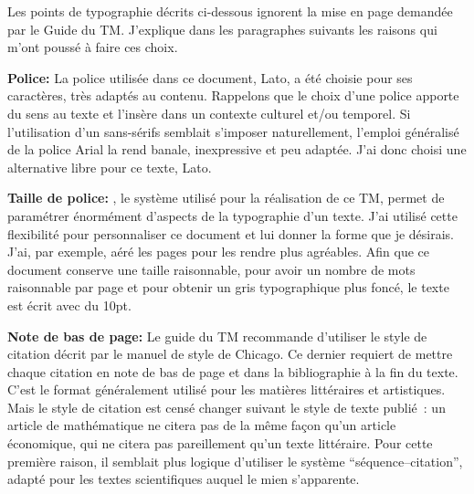 \hspace*{4.5cm}
\begin{minipage}{\textwidth-4.5cm}
	\setlength{\parskip}{\currentparskip}
	Les points de typographie décrits ci-dessous ignorent la mise en page demandée par le Guide du TM. J'explique dans les paragraphes suivants les raisons qui m'ont poussé à faire ces choix.
	
	\textbf{Police:} La police utilisée dans ce document, Lato, a été choisie pour ses caractères, très adaptés au contenu. Rappelons que le choix d'une police apporte du sens au texte et l'insère dans un contexte culturel et/ou temporel. Si l'utilisation d'un sans-sérifs semblait s'imposer naturellement, l'emploi généralisé de la police Arial la rend banale, inexpressive et peu adaptée. J'ai donc choisi une alternative libre pour ce texte, Lato.
	
	\textbf{Taille de police:} \XeLaTeX, le système utilisé pour la réalisation de ce TM, permet de paramétrer énormément d'aspects de la typographie d'un texte. J'ai utilisé cette flexibilité pour personnaliser ce document et lui donner la forme que je désirais. J'ai, par exemple, aéré les pages pour les rendre plus agréables. Afin que ce document conserve une taille raisonnable, pour avoir un nombre de mots raisonnable par page et pour obtenir un gris typographique plus foncé, le texte est écrit avec du 10pt.
	
	\textbf{Note de bas de page:} Le guide du TM recommande d'utiliser le style de citation décrit par le manuel de style de Chicago. Ce dernier requiert de mettre chaque citation en note de bas de page et dans la bibliographie à la fin du texte. C'est le format généralement utilisé pour les matières littéraires et artistiques. Mais le style de citation est censé changer suivant le style de texte publié : un article de mathématique ne citera pas de la même façon qu'un article économique, qui ne citera pas pareillement qu'un texte littéraire. Pour cette première raison, il semblait plus logique d'utiliser le système \enquote{séquence--citation}\cite{ScientificStyleandFormatOnlineCitationQuickGuide_}, adapté pour les textes scientifiques auquel le mien s’apparente.
\end{minipage}





